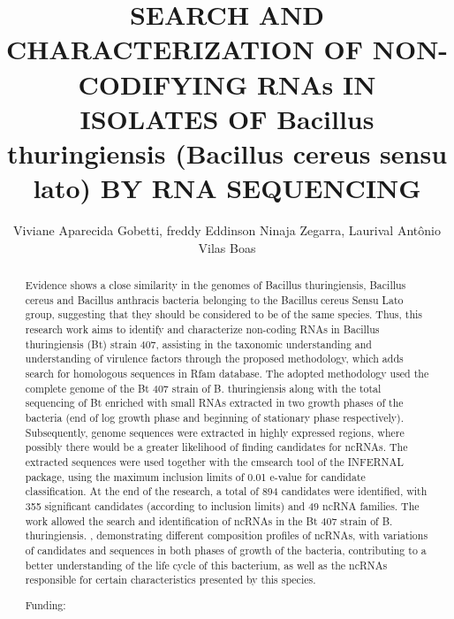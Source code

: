 \documentclass[twoside]{article}
\title{\vspace{-15mm}\fontsize{24pt}{10pt}\selectfont\textbf{ SEARCH AND CHARACTERIZATION OF NON-CODIFYING RNAs IN ISOLATES OF Bacillus thuringiensis (Bacillus cereus sensu lato) BY RNA SEQUENCING }} %
\author{ Viviane Aparecida Gobetti, freddy Eddinson Ninaja Zegarra, Laurival Ant\^onio Vilas Boas }
\affil{ Universidade Tecnol\'ogica Federal do Paran\'a }
\date{}
\begin{document}
  
  
  \maketitle %
  
  
  \thispagestyle{fancy} %
  
  
  \begin{abstract}
  Evidence shows a close similarity in the genomes of Bacillus thuringiensis,  Bacillus cereus and Bacillus anthracis bacteria belonging to the Bacillus cereus Sensu Lato group,  suggesting that they should be considered to be of the same species. Thus,  this research work aims to identify and characterize non-coding RNAs in Bacillus thuringiensis (Bt) strain 407,  assisting in the taxonomic understanding and understanding of virulence factors through the proposed methodology,  which adds search for homologous sequences in Rfam database. The adopted methodology used the complete genome of the Bt 407 strain of B. thuringiensis along with the total sequencing of Bt enriched with small RNAs extracted in two growth phases of the bacteria (end of log growth phase and beginning of stationary phase respectively). Subsequently,  genome sequences were extracted in highly expressed regions,  where possibly there would be a greater likelihood of finding candidates for ncRNAs. The extracted sequences were used together with the cmsearch tool of the INFERNAL package,  using the maximum inclusion limits of 0.01 e-value for candidate classification. At the end of the research,  a total of 894 candidates were identified,  with 355 significant candidates (according to inclusion limits) and 49 ncRNA families. The work allowed the search and identification of ncRNAs in the Bt 407 strain of B. thuringiensis. ,  demonstrating different composition profiles of ncRNAs,  with variations of candidates and sequences in both phases of growth of the bacteria,  contributing to a better understanding of the life cycle of this bacterium,  as well as the ncRNAs responsible for certain characteristics presented by this species.
  
  Funding:  \\ 
  \end{abstract}
  
\end{document}
